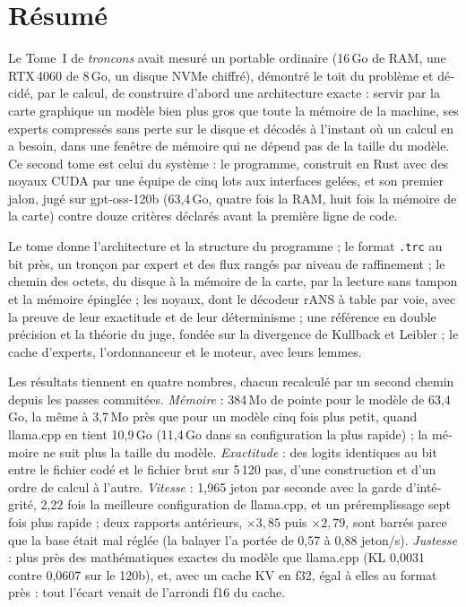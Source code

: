 \chapter*{Résumé}
\begin{otherlanguage}{french}
Le Tome~I de \emph{troncons} avait mesuré un portable ordinaire (16\,Go de RAM, une RTX\,4060 de 8\,Go, un disque NVMe chiffré), démontré le toit du problème et décidé, par le calcul, de construire d'abord une architecture exacte : servir par la carte graphique un modèle bien plus gros que toute la mémoire de la machine, ses experts compressés sans perte sur le disque et décodés à l'instant où un calcul en a besoin, dans une fenêtre de mémoire qui ne dépend pas de la taille du modèle. Ce second tome est celui du système : le programme, construit en Rust avec des noyaux CUDA par une équipe de cinq lots aux interfaces gelées, et son premier jalon, jugé sur gpt-oss-120b (63,4\,Go, quatre fois la RAM, huit fois la mémoire de la carte) contre douze critères déclarés avant la première ligne de code.

Le tome donne l'architecture et la structure du programme ; le format \texttt{.trc} au bit près, un tronçon par expert et des flux rangés par niveau de raffinement ; le chemin des octets, du disque à la mémoire de la carte, par la lecture sans tampon et la mémoire épinglée ; les noyaux, dont le décodeur rANS à table par voie, avec la preuve de leur exactitude et de leur déterminisme ; une référence en double précision et la théorie du juge, fondée sur la divergence de Kullback et Leibler ; le cache d'experts, l'ordonnanceur et le moteur, avec leurs lemmes.

Les résultats tiennent en quatre nombres, chacun recalculé par un second chemin depuis les passes commitées. \emph{Mémoire} : 384\,Mo de pointe pour le modèle de 63,4\,Go, la même à 3,7\,Mo près que pour un modèle cinq fois plus petit, quand llama.cpp en tient 10,9\,Go (11,4\,Go dans sa configuration la plus rapide) ; la mémoire ne suit plus la taille du modèle. \emph{Exactitude} : des logits identiques au bit entre le fichier codé et le fichier brut sur 5\,120 pas, d'une construction et d'un ordre de calcul à l'autre. \emph{Vitesse} : 1,965 jeton par seconde avec la garde d'intégrité, 2,22 fois la meilleure configuration de llama.cpp, et un préremplissage sept fois plus rapide ; deux rapports antérieurs, $\times 3{,}85$ puis $\times 2{,}79$, sont barrés parce que la base était mal réglée (la balayer l'a portée de 0,57 à 0,88 jeton/s). \emph{Justesse} : plus près des mathématiques exactes du modèle que llama.cpp (KL 0,0031 contre 0,0607 sur le 120b), et, avec un cache KV en f32, égal à elles au format près : tout l'écart venait de l'arrondi f16 du cache.


\end{otherlanguage}
